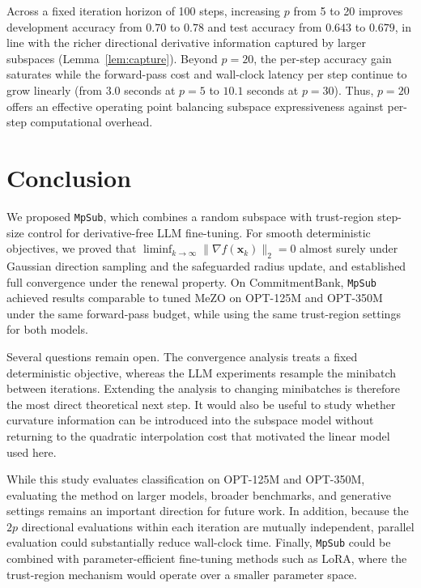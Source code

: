 \documentclass[smallextended]{svjour3}
\newcommand{\bx}{\bm{x}}
\begin{document}
Across a fixed iteration horizon of 100 steps, increasing $p$ from 5 to 20 improves development accuracy from $0.70$ to $0.78$ and test accuracy from $0.643$ to $0.679$, in line with the richer directional derivative information captured by larger subspaces (Lemma~\ref{lem:capture}). Beyond $p = 20$, the per-step accuracy gain saturates while the forward-pass cost and wall-clock latency per step continue to grow linearly (from $3.0$ seconds at $p = 5$ to $10.1$ seconds at $p = 30$). Thus, $p = 20$ offers an effective operating point balancing subspace expressiveness against per-step computational overhead.

\section{Conclusion}
\label{sec:conclusion}

We proposed \texttt{MpSub}, which combines a random subspace with trust-region step-size control for derivative-free LLM fine-tuning. For smooth deterministic objectives, we proved that $\liminf_{k\to\infty} \|\nabla f(\bx_k)\|_2 = 0$ almost surely under Gaussian direction sampling and the safeguarded radius update, and established full convergence under the renewal property. On CommitmentBank, \texttt{MpSub} achieved results comparable to tuned MeZO on OPT-125M and OPT-350M under the same forward-pass budget, while using the same trust-region settings for both models.

Several questions remain open. The convergence analysis treats a fixed deterministic objective, whereas the LLM experiments resample the minibatch between iterations. Extending the analysis to changing minibatches is therefore the most direct theoretical next step. It would also be useful to study whether curvature information can be introduced into the subspace model without returning to the quadratic interpolation cost that motivated the linear model used here.

While this study evaluates classification on OPT-125M and OPT-350M, evaluating the method on larger models, broader benchmarks, and generative settings remains an important direction for future work. In addition, because the $2p$ directional evaluations within each iteration are mutually independent, parallel evaluation could substantially reduce wall-clock time. Finally, \texttt{MpSub} could be combined with parameter-efficient fine-tuning methods such as LoRA, where the trust-region mechanism would operate over a smaller parameter space.
\end{document}
